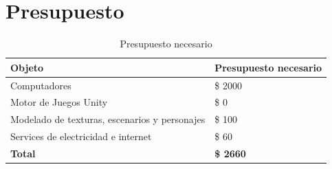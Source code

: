 \section{Presupuesto}

\begin{table}[H]
    \centering
    \begin{tabular}{|p{6cm}|p{4cm}|}
        \hline
        \textbf{Objeto} & \textbf{Presupuesto necesario} \\
        \hline
        Computadores & \$ 2000 \\
        \hline
        Motor de Juegos Unity & \$ 0 \\
        \hline
        Modelado de texturas, escenarios y personajes & \$ 100 \\
        \hline
        Services de electricidad e internet & \$ 60 \\
        \hline
        \textbf{Total} & \textbf{\$ 2660} \\
        \hline
    \end{tabular}
    \caption{Presupuesto necesario}
    \label{tab:presupuesto}
\end{table}
